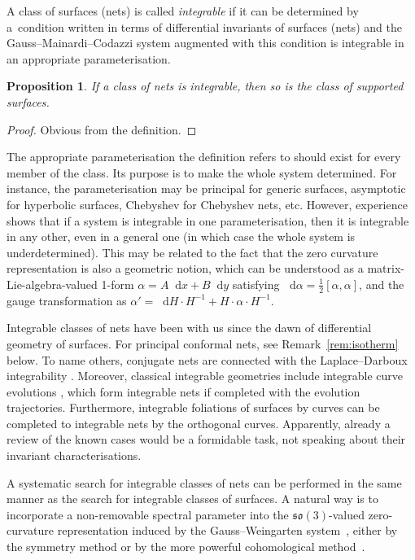 \documentclass[pdftex]{sigma}
\newtheorem{Proposition}[Theorem]{Proposition}
 { \theoremstyle{definition}
\newtheorem{construction}[Theorem]{Construction}
\newtheorem{Definition}[Theorem]{Definition}
\newtheorem{Example}[Theorem]{Example}
\newtheorem{Remark}[Theorem]{Remark} }
\numberwithin{equation}{section}
\def\dif{\mathop{}\!\mathrm d}
\begin{document}
\begin{Definition}
\label{def:integ}
A class of surfaces (nets) is called {\it integrable} if it can be determined by a~condition written in terms of differential invariants of surfaces (nets) and the
Gauss--Mainardi--Codazzi system augmented with this condition
is integrable in an appropriate parameterisation.
\end{Definition}

\begin{Proposition}%
If a class of nets is integrable,
then so is the class of supported surfaces.
\end{Proposition}

\begin{proof}Obvious from the definition.
\end{proof}

The appropriate parameterisation the definition refers to
should exist for every member of the class.
Its purpose is to make the whole system determined.
For instance, the parameterisation may be principal for generic surfaces,
asymptotic for hyperbolic surfaces, Chebyshev for Chebyshev nets, etc.
However, experience shows that if a system is integrable in one parameterisation,
then it is integrable in any other, even in a general one
(in which case the whole system is underdetermined).
This may be related to the fact that the zero curvature representation is also a geometric
notion, which can be understood as a matrix-Lie-algebra-valued 1-form
$\alpha = A \dif x + B \dif y$
satisfying $\dif \alpha = \frac12 [\alpha,\alpha]$,
and the gauge transformation as
$\alpha' = \dif H \cdot H^{-1} + H \cdot \alpha \cdot H^{-1}$.

Integrable classes of nets have been with us since the dawn of differential geometry
of surfaces.
For principal conformal nets, see Remark~\ref{rem:isotherm} below.
To name others, conjugate nets are connected with the
Laplace--Darboux integrability \cite{GD-I,BGK-1993}.
Moreover, classical integrable geometries include
integrable curve evolutions \cite{HH-1972,GLL-1977,M-B-2008,R-S,S-R-1999},
which form integrable nets if completed with the evolution trajectories.
Furthermore, integrable foliations of surfaces by curves
\cite{C-T-1981,WKS-2003,CT-1988}
can be completed to integrable nets by the orthogonal curves.
Apparently, already a review of the known cases would be a formidable task, not
speaking about their invariant characterisations.

A systematic search for integrable classes of nets can be performed in the same
manner as the search for integrable classes of surfaces.
A natural way is to incorporate a non-removable spectral parameter into
the $\mathfrak{so}(3)$-valued zero-curvature representation induced by the
Gauss--Weingarten system~\cite{Sym},
either by the symmetry method \cite{JC-1993,L-S-T,DCF-LAOS}
or by the more powerful cohomological method~\cite{B-M-2009}.
\end{document}

